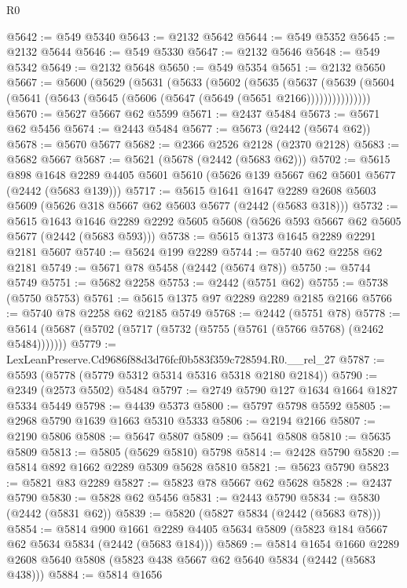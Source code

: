 \begin{lexlean}{R0}
\begin{coremodule}
@5642 := @549 @5340
@5643 := @2132 @5642
@5644 := @549 @5352
@5645 := @2132 @5644
@5646 := @549 @5330
@5647 := @2132 @5646
@5648 := @549 @5342
@5649 := @2132 @5648
@5650 := @549 @5354
@5651 := @2132 @5650
@5667 := @5600
    (@5629
      (@5631
        (@5633
          (@5602
            (@5635
              (@5637
                (@5639 (@5604 (@5641 (@5643 (@5645 (@5606 (@5647 (@5649 (@5651 @2166)))))))))))))))
@5670 := @5627 @5667 @62 @5599
@5671 := @2437 @5484
@5673 := @5671 @62 @5456
@5674 := @2443 @5484
@5677 := @5673 (@2442 (@5674 @62))
@5678 := @5670 @5677
@5682 := @2366 @2526 @2128 (@2370 @2128)
@5683 := @5682 @5667
@5687 := @5621 (@5678 (@2442 (@5683 @62)))
@5702 := @5615
    @898
    @1648
    @2289
    @4405
    @5601
    @5610
    (@5626 @139 @5667 @62 @5601 @5677 (@2442 (@5683 @139)))
@5717 := @5615
    @1641
    @1647
    @2289
    @2608
    @5603
    @5609
    (@5626 @318 @5667 @62 @5603 @5677 (@2442 (@5683 @318)))
@5732 := @5615
    @1643
    @1646
    @2289
    @2292
    @5605
    @5608
    (@5626 @593 @5667 @62 @5605 @5677 (@2442 (@5683 @593)))
@5738 := @5615 @1373 @1645 @2289 @2291 @2181 @5607
@5740 := @5624 @199 @2289
@5744 := @5740 @62 @2258 @62 @2181
@5749 := @5671 @78 @5458 (@2442 (@5674 @78))
@5750 := @5744 @5749
@5751 := @5682 @2258
@5753 := @2442 (@5751 @62)
@5755 := @5738 (@5750 @5753)
@5761 := @5615 @1375 @97 @2289 @2289 @2185 @2166
@5766 := @5740 @78 @2258 @62 @2185 @5749
@5768 := @2442 (@5751 @78)
@5778 := @5614 (@5687 (@5702 (@5717 (@5732 (@5755 (@5761 (@5766 @5768) (@2462 @5484)))))))
@5779 := LexLeanPreserve.Cd9686f88d3d76fcf0b583f359c728594.R0.__rel_27
@5787 := @5593 (@5778 (@5779 @5312 @5314 @5316 @5318 @2180 @2184))
@5790 := @2349 (@2573 @5502) @5484
@5797 := @2749 @5790 @127 @1634 @1664 @1827 @5334 @5449
@5798 := @4439 @5373
@5800 := @5797 @5798 @5592
@5805 := @2968 @5790 @1639 @1663 @5310 @5333
@5806 := @2194 @2166
@5807 := @2190 @5806
@5808 := @5647 @5807
@5809 := @5641 @5808
@5810 := @5635 @5809
@5813 := @5805 (@5629 @5810) @5798
@5814 := @2428 @5790
@5820 := @5814 @892 @1662 @2289 @5309 @5628 @5810
@5821 := @5623 @5790
@5823 := @5821 @83 @2289
@5827 := @5823 @78 @5667 @62 @5628
@5828 := @2437 @5790
@5830 := @5828 @62 @5456
@5831 := @2443 @5790
@5834 := @5830 (@2442 (@5831 @62))
@5839 := @5820 (@5827 @5834 (@2442 (@5683 @78)))
@5854 := @5814
    @900
    @1661
    @2289
    @4405
    @5634
    @5809
    (@5823 @184 @5667 @62 @5634 @5834 (@2442 (@5683 @184)))
@5869 := @5814
    @1654
    @1660
    @2289
    @2608
    @5640
    @5808
    (@5823 @438 @5667 @62 @5640 @5834 (@2442 (@5683 @438)))
@5884 := @5814
    @1656

\end{coremodule}
\end{lexlean}
